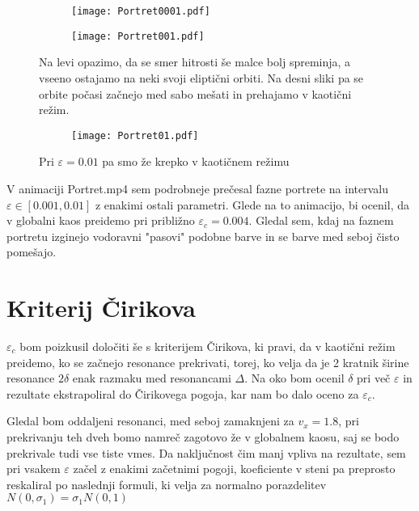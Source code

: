 \documentclass{article}
\begin{document}
\begin{figure}[H]
\centering
\begin{subfigure}{.49\textwidth}
\texttt{[image: Portret0001.pdf]}
\end{subfigure}
\begin{subfigure}{.49\textwidth}
\texttt{[image: Portret001.pdf]}
\end{subfigure}
\caption*{Na levi opazimo, da se smer hitrosti še malce bolj spreminja, a vseeno ostajamo na neki svoji eliptični orbiti. Na desni sliki pa se orbite počasi začnejo med sabo mešati in prehajamo v kaotični režim.}
\end{figure}

\begin{figure}[H]
\centering
\begin{subfigure}{.49\textwidth}
\texttt{[image: Portret01.pdf]}
\end{subfigure}
\caption*{Pri $\varepsilon=0.01$ pa smo že krepko v kaotičnem režimu}
\end{figure}

V animaciji Portret.mp4 sem podrobneje prečesal fazne portrete na intervalu $\varepsilon \in [0.001,0.01]$ z enakimi ostali parametri. Glede na to animacijo, bi ocenil, da v globalni kaos preidemo pri približno $\varepsilon_c=0.004$. Gledal sem, kdaj na faznem portretu izginejo vodoravni "pasovi" podobne barve in se barve med seboj čisto pomešajo.

\section{Kriterij Čirikova}

$\varepsilon_c$ bom poizkusil določiti še s kriterijem Čirikova, ki pravi, da v kaotični režim preidemo, ko se začnejo resonance prekrivati, torej, ko velja da je 2 kratnik širine resonance $2 \delta$ enak razmaku med resonancami $\Delta$. Na oko bom ocenil $\delta$ pri več $\varepsilon$ in rezultate ekstrapoliral do Čirikovega pogoja, kar nam bo dalo oceno za $\varepsilon_c$. 

Gledal bom oddaljeni resonanci, med seboj zamaknjeni za $v_x=1.8$, pri prekrivanju teh dveh bomo namreč zagotovo že v globalnem kaosu, saj se bodo prekrivale tudi vse tiste vmes. Da naključnost čim manj vpliva na rezultate, sem pri vsakem $\varepsilon$ začel z enakimi začetnimi pogoji, koeficiente v steni pa preprosto reskaliral po naslednji formuli, ki velja za normalno porazdelitev  $N(0,\sigma_1) = \sigma_1 N(0,1)$
\end{document}
